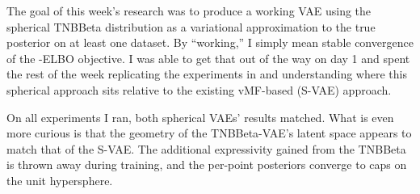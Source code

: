 The goal of this week's research was to produce a working VAE using the spherical
TNBBeta distribution as a variational approximation to the true posterior
on at least one dataset. By ``working,'' I simply mean stable convergence of the
-ELBO objective. I was able to get that out of the way on day 1 and spent the rest
of the week replicating the experiments in \citep{davidson2022hypersphericalvariationalautoencoders}
and understanding where this spherical approach sits relative to the existing
vMF-based (S-VAE) approach.

On all experiments I ran, both spherical VAEs' results matched. What is even more
curious is that the geometry of the TNBBeta-VAE's latent space appears to match
that of the S-VAE. The additional expressivity gained from the TNBBeta is thrown
away during training, and the per-point posteriors converge to caps on the unit
hypersphere.